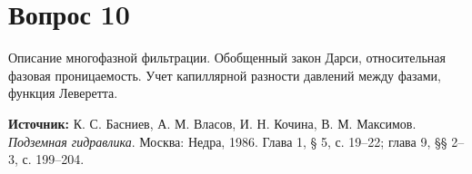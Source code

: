 \documentclass[12pt,a4paper]{article}
\begin{document}
\section*{Вопрос 10}
Описание многофазной фильтрации. Обобщенный закон Дарси, относительная фазовая проницаемость. Учет капиллярной разности давлений между фазами, функция Леверетта.

\medskip
\noindent\textbf{Источник:} К. С. Басниев, А. М. Власов, И. Н. Кочина, В. М. Максимов. \textit{Подземная гидравлика}. Москва: Недра, 1986. Глава 1, § 5, с. 19--22; глава 9, §§ 2--3, с. 199--204.
\par\bigskip

\end{document}
